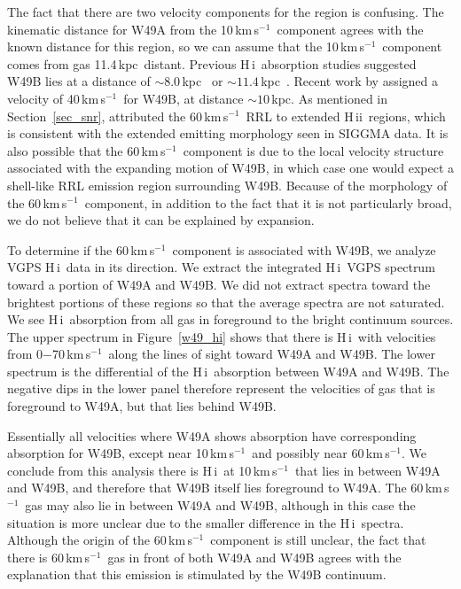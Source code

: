 \documentclass[manuscript]{aastex61}
\newcommand{\hii}{{\rm H\,}{{\sc ii}}}
\newcommand{\hi}{{\rm H\,}{{\sc i}}}
\newcommand{\kms}{\,km\,s$^{-1}$}
\newcommand{\kpc}{\,kpc}
\begin{document}
The fact that there are two velocity components for the region is confusing.
The kinematic distance for W49A from the 10\kms\ component agrees with the known distance for this region, so we can assume that the 10\kms\ component comes from gas 11.4\kpc\ distant.
Previous \hi\ absorption studies suggested W49B lies at a distance of $\sim8.0$\kpc\ \citep{Moffett1994} or $\sim11.4$\kpc\ \citep{Brogan2001}.
Recent work by \citet{Zhu2014} assigned a velocity of 40\kms\ for W49B, at distance $\sim10$\kpc.
As mentioned in Section~\ref{sec_snr}, \citet{Pankonin1976} attributed the 60\kms\ RRL to extended \hii\ regions, which is consistent with the extended emitting morphology seen in SIGGMA data.
It is also possible that the 60\kms\ component is due to the local velocity structure associated with the expanding motion of W49B, in which case one would expect a shell-like RRL emission region surrounding W49B.
Because of the morphology of the 60\kms\ component, in addition to the fact that it is not particularly broad, we do not believe that it can be explained by expansion. 

To determine if the 60\kms\ component is associated with W49B, we analyze VGPS \hi\ data in its direction.  We extract the integrated \hi\ VGPS spectrum toward a portion of W49A and W49B.  We did not extract spectra toward the brightest portions of these regions so that the average spectra are not saturated.  We see \hi\ absorption from all gas in foreground to the bright continuum sources.
The upper spectrum in Figure~\ref{w49_hi} shows that there is \hi\ with velocities from 0$-$70\kms\ along the lines of sight toward W49A and W49B.
The lower spectrum is the differential of the \hi\ absorption between W49A and W49B.  The negative dips in the lower panel therefore represent the velocities of gas that is foreground to W49A, but that lies behind W49B.

Essentially all velocities where W49A shows absorption have corresponding absorption for W49B, except near 10\kms\ and possibly near 60\kms.
We conclude from this analysis there is \hi\ at 10\kms\ that lies in between W49A and W49B, and therefore that W49B itself lies foreground to W49A.
The 60\kms\ gas may also lie in between W49A and W49B, although in this case the situation is more unclear due to the smaller difference in the \hi\ spectra.
Although the origin of the 60\kms\ component is still unclear, the fact that there is 60\kms\ gas in front of both W49A and W49B agrees with the explanation that this emission is stimulated by the W49B continuum.
\end{document}
